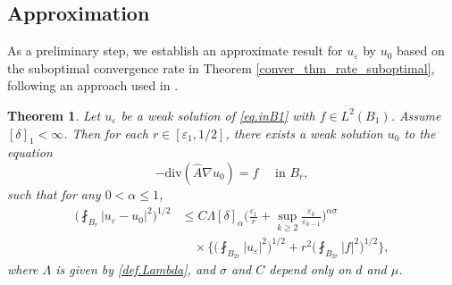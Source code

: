 \documentclass[reqno,12pt]{amsart} %
\newtheorem{theorem}{Theorem}[section]
\theoremstyle{definition}
\theoremstyle{remark}
\numberwithin{equation}{section}
\newcommand{\e}{\varepsilon}
\begin{document}
\subsection{Approximation}
As a preliminary step, we establish an approximate result for $u_\varepsilon$ by $u_0$ based on the suboptimal convergence rate in Theorem \ref{conver_thm_rate_suboptimal}, following an approach used in \cite[Lemma 6.1]{Niu25_Optimal}.

\begin{theorem}\label{thm_approx}
Let $u_\varepsilon$ be a weak solution of \eqref{eq.inB1} with $f\in L^2(B_{1})$. Assume $[\delta]_1<\infty$. Then for each $r\in[\varepsilon_1, 1/2]$, there exists a weak solution $u_0$ to the equation
$$-\mathrm{div}(\widehat{A} \nabla u_0)=f \quad \text{ in } B_r,$$ 
such that for any $0<\alpha\leq 1$,
  \begin{align*}
    \bigg(\fint_{B_r}|u_\varepsilon-u_0|^2\bigg)^{1/2}&\leq C\Lambda [\delta]_\alpha\bigg(\frac{\varepsilon_1}{r}+\sup_{k\geq 2}\frac{\e_k}{\e_{k-1}}\bigg)^{\alpha\sigma} \\&\quad\times \bigg\{\bigg(\fint_{B_{2r}}|u_\varepsilon|^2\bigg)^{1/2}+r^2\bigg(\fint_{B_{2r}}|f|^2\bigg)^{1/2}\bigg\},
  \end{align*}
  where $\Lambda $ is given by \eqref{def.Lambda}, and $\sigma$ and $C$ depend only on $d$ and $\mu$.
\end{theorem}
\end{document}
